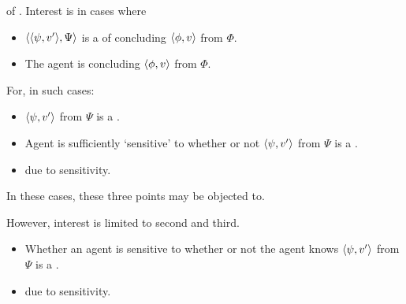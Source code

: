 \begin{note}
   of .
  Interest is in cases where

  \begin{itemize}
  \item
    \(\langle \langle \psi, v' \rangle, \Psi \rangle\) is a \requ{} of concluding \(\langle \phi, v \rangle\) from \(\Phi\).
  \item
    The agent is concluding \(\langle \phi, v \rangle\) from \(\Phi\).
  \end{itemize}
  For, in such cases:
  \begin{itemize}
  \item
    \(\langle \psi, v' \rangle\) from \(\Psi\) is a \fc{}.
  \item
    Agent is sufficiently `sensitive' to whether or not \(\langle \psi, v' \rangle\) from \(\Psi\) is a \fc{}.
  \item
    \ninf{} due to sensitivity.
  \end{itemize}
  In these cases, these three points may be objected to.

  However, interest is limited to second and third.

  \begin{itemize}
  \item
    Whether an agent is sensitive to whether or not the agent knows \(\langle \psi, v' \rangle\) from \(\Psi\) is a \fc{}.
  \item
     due to sensitivity.
  \end{itemize}
\end{note}

